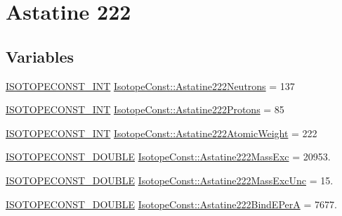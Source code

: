 \hypertarget{group___isotope_const-_astatine-_at222}{}\section{Astatine 222}
\label{group___isotope_const-_astatine-_at222}
\subsection*{Variables}
\begin{DoxyCompactItemize}
\item 
\mbox{\hyperlink{group___isotope_const-_macros_ga5f18360b3e99483a35c32d789e62621c}{I\+S\+O\+T\+O\+P\+E\+C\+O\+N\+S\+T\+\_\+\+I\+NT}} \mbox{\hyperlink{group___isotope_const-_astatine-_at222_ga9d4fd1764fd00e23ab6d8aca2f3164f4}{Isotope\+Const\+::\+Astatine222\+Neutrons}} = 137
\item 
\mbox{\hyperlink{group___isotope_const-_macros_ga5f18360b3e99483a35c32d789e62621c}{I\+S\+O\+T\+O\+P\+E\+C\+O\+N\+S\+T\+\_\+\+I\+NT}} \mbox{\hyperlink{group___isotope_const-_astatine-_at222_ga7419970ca4d12fc7d63d1f4f1c174faa}{Isotope\+Const\+::\+Astatine222\+Protons}} = 85
\item 
\mbox{\hyperlink{group___isotope_const-_macros_ga5f18360b3e99483a35c32d789e62621c}{I\+S\+O\+T\+O\+P\+E\+C\+O\+N\+S\+T\+\_\+\+I\+NT}} \mbox{\hyperlink{group___isotope_const-_astatine-_at222_ga8aa74cc6760d1c637c0503cec11a34d9}{Isotope\+Const\+::\+Astatine222\+Atomic\+Weight}} = 222
\item 
\mbox{\hyperlink{group___isotope_const-_macros_ga8f45a7272ce02c0b4c65c44636ed719a}{I\+S\+O\+T\+O\+P\+E\+C\+O\+N\+S\+T\+\_\+\+D\+O\+U\+B\+LE}} \mbox{\hyperlink{group___isotope_const-_astatine-_at222_ga7c41b9e9ced1599f92fb84ff2dd88651}{Isotope\+Const\+::\+Astatine222\+Mass\+Exc}} = 20953.
\item 
\mbox{\hyperlink{group___isotope_const-_macros_ga8f45a7272ce02c0b4c65c44636ed719a}{I\+S\+O\+T\+O\+P\+E\+C\+O\+N\+S\+T\+\_\+\+D\+O\+U\+B\+LE}} \mbox{\hyperlink{group___isotope_const-_astatine-_at222_ga793779e397154942364b4a51865ba740}{Isotope\+Const\+::\+Astatine222\+Mass\+Exc\+Unc}} = 15.
\item 
\mbox{\hyperlink{group___isotope_const-_macros_ga8f45a7272ce02c0b4c65c44636ed719a}{I\+S\+O\+T\+O\+P\+E\+C\+O\+N\+S\+T\+\_\+\+D\+O\+U\+B\+LE}} \mbox{\hyperlink{group___isotope_const-_astatine-_at222_ga3d4bf1ce9002a98ce5602caf892fca2c}{Isotope\+Const\+::\+Astatine222\+Bind\+E\+PerA}} = 7677.
\item 

\end{DoxyCompactItemize}
